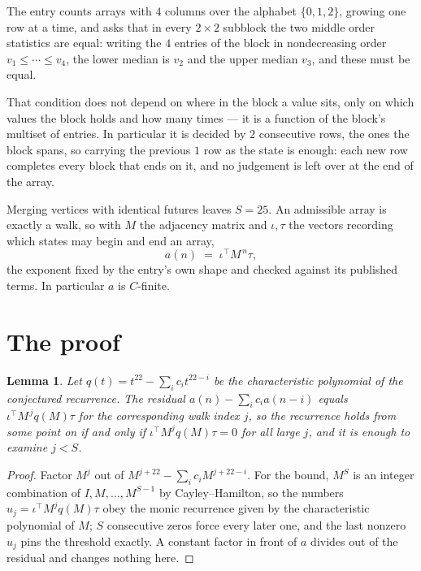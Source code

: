 \documentclass[11pt,a4paper]{article}
\theoremstyle{plain}
\newtheorem{lemma}[theorem]{Lemma}
\theoremstyle{definition}
\begin{document}
The entry counts arrays with $4$ columns over the alphabet $\{0,1,2\}$, growing one row at a time, and asks that in every $2\times2$ subblock the two middle order statistics are equal: writing the $4$ entries of the block in nondecreasing order $v_1\le\cdots\le v_{4}$, the lower median is $v_{2}$ and the upper median $v_{3}$, and these must be equal.

That condition does not depend on where in the block a value sits, only on which values the block holds and how many times --- it is a function of the block's multiset of entries. In particular it is decided by $2$ consecutive rows, the ones the block spans, so carrying the previous $1$ row as the state is enough: each new row completes every block that ends on it, and no judgement is left over at the end of the array.

Merging vertices with identical futures leaves $S=25$. An admissible array is exactly a walk, so with $M$ the adjacency matrix and $\iota,\tau$ the vectors recording which states may begin and end an array,
\[
a(n)\;=\;\iota^{\!\top}M^{\,n}\tau ,
\]
the exponent fixed by the entry's own shape and checked against its published terms. In
particular $a$ is $C$-finite.

\section{The proof}

\begin{lemma}\label{lem:crit}
Let $q(t)=t^{22}-\sum_i c_it^{22-i}$ be the characteristic polynomial of the
conjectured recurrence. The residual $a(n)-\sum_ic_ia(n-i)$ equals
$\iota^{\!\top}M^{\,j}q(M)\tau$ for the corresponding walk index $j$, so the recurrence
holds from some point on if and only if $\iota^{\!\top}M^{j}q(M)\tau=0$ for all large $j$,
and it is enough to examine $j<S$.
\end{lemma}

\begin{proof}
Factor $M^{j}$ out of $M^{j+22}-\sum_ic_iM^{j+22-i}$. For the bound, $M^{S}$
is an integer combination of $I,M,\dots,M^{S-1}$ by Cayley--Hamilton, so the numbers
$u_j=\iota^{\!\top}M^{j}q(M)\tau$ obey the monic recurrence given by the characteristic
polynomial of $M$; $S$ consecutive zeros force every later one, and the last nonzero $u_j$
pins the threshold exactly. A constant factor in front of $a$ divides out of the residual and
changes nothing here.
\end{proof}
\end{document}
